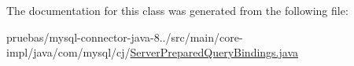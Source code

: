 The documentation for this class was generated from the following file\+:\begin{DoxyCompactItemize}
\item 
pruebas/mysql-\/connector-\/java-\/8../src/main/core-\/impl/java/com/mysql/cj/\mbox{\hyperlink{_server_prepared_query_bindings_8java}{Server\+Prepared\+Query\+Bindings.\+java}}\end{DoxyCompactItemize}
